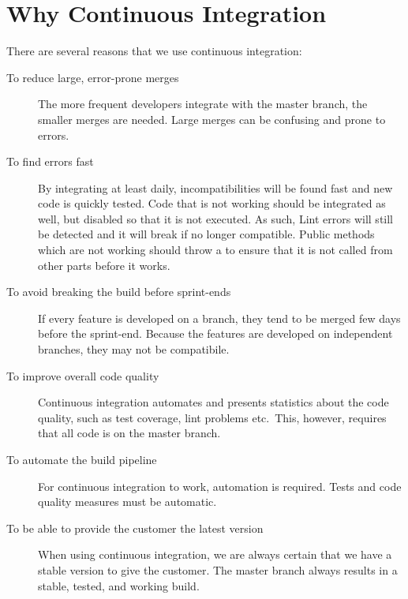 \section{Why Continuous Integration}
There are several reasons that we use continuous integration:
\begin{description}
  \item[To reduce large, error-prone merges] The more frequent developers integrate with the master branch, the smaller merges are needed. Large merges can be confusing and prone to errors.
  \item[To find errors fast] By integrating at least daily, incompatibilities will be found fast and new code is quickly tested. Code that is not working should be integrated as well, but disabled so that it is not executed. As such, Lint errors will still be detected and it will break if no longer compatible. Public methods which are not working should throw a  to ensure that it is not called from other parts before it works.
  \item[To avoid breaking the build before sprint-ends] If every feature is developed on a branch, they tend to be merged few days before the sprint-end. Because the features are developed on independent branches, they may not be compatibile.
  \item[To improve overall code quality] Continuous integration automates and presents statistics about the code quality, such as test coverage, lint problems etc.\ This, however, requires that all code is on the master branch.
  \item[To automate the build pipeline] For continuous integration to work, automation is required. Tests and code quality measures must be automatic.
  \item[To be able to provide the customer the latest version] When using continuous integration, we are always certain that we have a stable version to give the customer. The master branch always results in a stable, tested, and working build.
\end{description}